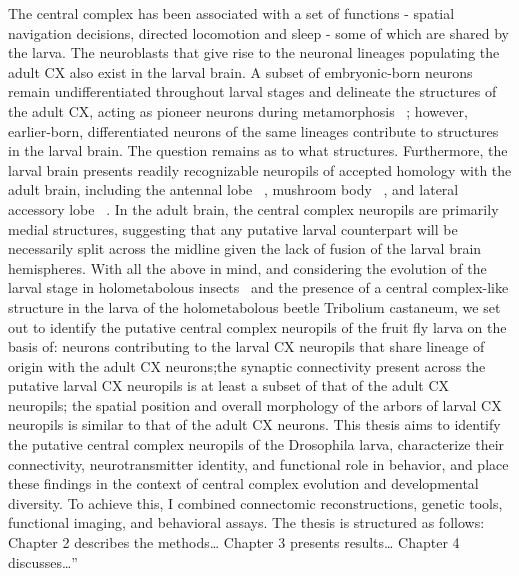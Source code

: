     The central complex has been associated with a set of functions - spatial navigation decisions, directed locomotion and sleep - some of which are shared by the larva. The neuroblasts that give rise to the neuronal lineages populating the adult CX also exist in the larval brain. A subset of embryonic-born neurons remain undifferentiated throughout larval stages and delineate the structures of the adult CX, acting as pioneer neurons during metamorphosis 
    ~\citep{andrade2019developmentally}; however, earlier-born, differentiated neurons of the same lineages contribute to structures in the larval brain. The question remains as to what structures. Furthermore, the larval brain presents readily recognizable neuropils of accepted homology with the adult brain, including the antennal lobe ~\citep{berck2016wiring}, mushroom body ~\citep{eichler2017complete}, and lateral accessory lobe ~\citep{hartenstein2015lineage}.
    In the adult brain, the central complex neuropils are primarily medial structures, suggesting that any putative larval counterpart will be necessarily split across the midline given the lack of fusion of the larval brain hemispheres. With all the above in mind, and considering the evolution of the larval stage in holometabolous insects ~\citep{truman1999origins}and the presence of a central complex-like structure in the larva of the holometabolous beetle Tribolium castaneum, we set out to identify the putative central complex neuropils of the fruit fly larva on the basis of: neurons contributing to the larval CX neuropils that share lineage of origin with the adult CX neurons;the synaptic connectivity present across the putative larval CX neuropils is at least a subset of that of the adult CX neuropils; the spatial position and overall morphology of the arbors of larval CX neuropils is similar to that of the adult CX neurons. 
    This thesis aims to identify the putative central complex neuropils of the Drosophila larva, characterize their connectivity, neurotransmitter identity, and functional role in behavior, and place these findings in the context of central complex evolution and developmental diversity. To achieve this, I combined connectomic reconstructions, genetic tools, functional imaging, and behavioral assays. The thesis is structured as follows: Chapter 2 describes the methods… Chapter 3 presents results… Chapter 4 discusses…”


